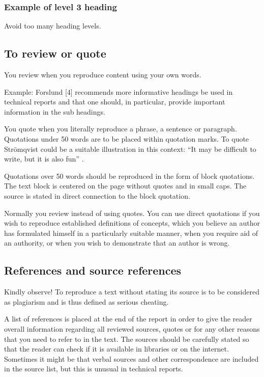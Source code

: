 \subsubsection{Example of level 3 heading}
\label{ch:theory:level3-heading}
Avoid too many heading levels.

\subsection{To review or quote}
\label{ch:theory:review:quote}
You review when you reproduce content using your own words.

Example: Forslund [4] recommends more informative headings be used in technical reports and that one should, in particular, provide important information in the sub headings.

You quote when you literally reproduce a phrase, a sentence or paragraph. Quotations under 50 words are to be placed within quotation marks. To quote Strömqvist could be a suitable illustration in this context: “It may be difficult to write, but it is also fun” \cite{stomquist}.

Quotations over 50 words should be reproduced in the form of block quotations. The text block is centered on the page without quotes and in small caps. The source is stated in direct connection to the block quotation.

Normally you review instead of using quotes. You can use direct quotations if you wish to reproduce established definitions of concepts, which you believe an author has formulated himself in a particularly suitable manner, when you require aid of an authority, or when you wish to demonstrate that an author is wrong.

\subsection{References and source references}
Kindly observe! To reproduce a text without stating its source is to be considered as plagiarism and is thus defined as serious cheating.

A list of references is placed at the end of the report in order to give the reader overall information regarding all reviewed sources, quotes or for any other reasons that you need to refer to in the text. The sources should be carefully stated so that the reader can check if it is available in libraries or on the internet. Sometimes it might be that verbal sources and other correspondence are included in the source list, but this is unusual in technical reports.

